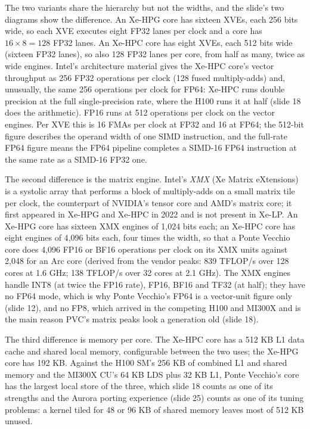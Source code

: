 \documentclass[11pt,letterpaper]{article}
\begin{document}
The two variants share the hierarchy but not the widths, and the slide's two diagrams show the difference. An Xe-HPG core has sixteen XVEs, each 256 bits wide, so each XVE executes eight FP32 lanes per clock and a core has $16 \times 8 = 128$ FP32 lanes. An Xe-HPC core has eight XVEs, each 512 bits wide (sixteen FP32 lanes), so also 128 FP32 lanes per core, from half as many, twice as wide engines. Intel's architecture material gives the Xe-HPC core's vector throughput as 256 FP32 operations per clock (128 fused multiply-adds) and, unusually, the same 256 operations per clock for FP64: Xe-HPC runs double precision at the full single-precision rate, where the H100 runs it at half (slide 18 does the arithmetic). FP16 runs at 512 operations per clock on the vector engines. Per XVE this is 16 FMAs per clock at FP32 and 16 at FP64; the 512-bit figure describes the operand width of one SIMD instruction, and the full-rate FP64 figure means the FP64 pipeline completes a SIMD-16 FP64 instruction at the same rate as a SIMD-16 FP32 one.

The second difference is the matrix engine. Intel's \emph{XMX} (Xe Matrix eXtensions) is a systolic array that performs a block of multiply-adds on a small matrix tile per clock, the counterpart of NVIDIA's tensor core and AMD's matrix core; it first appeared in Xe-HPG and Xe-HPC in 2022 and is not present in Xe-LP. An Xe-HPG core has sixteen XMX engines of 1{,}024 bits each; an Xe-HPC core has eight engines of 4{,}096 bits each, four times the width, so that a Ponte Vecchio core does 4{,}096 FP16 or BF16 operations per clock on its XMX units against 2{,}048 for an Arc core (derived from the vendor peaks: 839 TFLOP/s over 128 cores at 1.6 GHz; 138 TFLOP/s over 32 cores at 2.1 GHz). The XMX engines handle INT8 (at twice the FP16 rate), FP16, BF16 and TF32 (at half); they have no FP64 mode, which is why Ponte Vecchio's FP64 is a vector-unit figure only (slide 12), and no FP8, which arrived in the competing H100 and MI300X and is the main reason PVC's matrix peaks look a generation old (slide 18).

The third difference is memory per core. The Xe-HPC core has a 512 KB L1 data cache and shared local memory, configurable between the two uses; the Xe-HPG core has 192 KB. Against the H100 SM's 256 KB of combined L1 and shared memory and the MI300X CU's 64 KB LDS plus 32 KB L1, Ponte Vecchio's core has the largest local store of the three, which slide 18 counts as one of its strengths and the Aurora porting experience (slide 25) counts as one of its tuning problems: a kernel tiled for 48 or 96 KB of shared memory leaves most of 512 KB unused.
\end{document}
